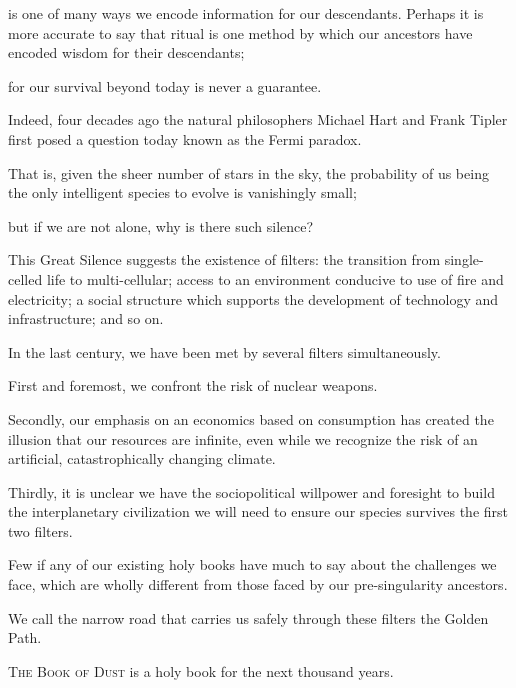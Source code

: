 
\begin{multicols}{2}
\bversenonum {} is one of many ways we encode information for our descendants.
\bversenopar Perhaps it is more accurate to say that ritual is one method by which our ancestors have encoded wisdom for their descendants;

\bverse for our survival beyond today is never a guarantee.

\bverse Indeed, four decades ago the natural philosophers Michael Hart and Frank Tipler first posed a question today known as the Fermi paradox.

\bverse That is, given the sheer number of stars in the sky, the probability of us being the only intelligent species to evolve is vanishingly small;

\bverse but if we are not alone, why is there such silence?

\bverse This Great Silence suggests the existence of filters: the transition from single-celled life to multi-cellular; access to an environment conducive to use of fire and electricity; a social structure which supports the development of technology and infrastructure; and so on.

\bverse In the last century, we have been met by several filters simultaneously.

\bverse First and foremost, we confront the risk of nuclear weapons.

\bverse Secondly, our emphasis on an economics based on consumption has created the illusion that our resources are infinite, even while we recognize the risk of an artificial, catastrophically changing climate.

\bverse Thirdly, it is unclear we have the sociopolitical willpower and foresight to build the interplanetary civilization we will need to ensure our species survives the first two filters.

\bverse Few if any of our existing holy books have much to say about the challenges we face, which are wholly different from those faced by our pre-singularity ancestors.

\bverse We call the narrow road that carries us safely through these filters the Golden Path.

\bverse \textsc{The Book of Dust} is a holy book for the next thousand years.


\end{multicols}
